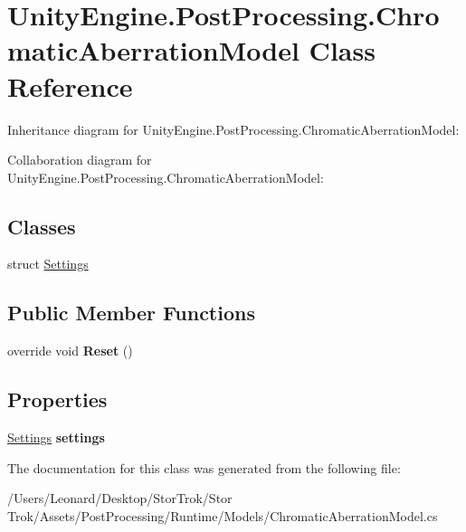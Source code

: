 \hypertarget{class_unity_engine_1_1_post_processing_1_1_chromatic_aberration_model}{}\section{Unity\+Engine.\+Post\+Processing.\+Chromatic\+Aberration\+Model Class Reference}
\label{class_unity_engine_1_1_post_processing_1_1_chromatic_aberration_model}


Inheritance diagram for Unity\+Engine.\+Post\+Processing.\+Chromatic\+Aberration\+Model\+:


Collaboration diagram for Unity\+Engine.\+Post\+Processing.\+Chromatic\+Aberration\+Model\+:
\subsection*{Classes}
\begin{DoxyCompactItemize}
\item 
struct \hyperlink{struct_unity_engine_1_1_post_processing_1_1_chromatic_aberration_model_1_1_settings}{Settings}
\end{DoxyCompactItemize}
\subsection*{Public Member Functions}
\begin{DoxyCompactItemize}
\item 
\mbox{\label{class_unity_engine_1_1_post_processing_1_1_chromatic_aberration_model_a10912d80b3a86b38f88a0bfee52ff948}} 
override void {\bfseries Reset} ()
\end{DoxyCompactItemize}
\subsection*{Properties}
\begin{DoxyCompactItemize}
\item 
\mbox{\label{class_unity_engine_1_1_post_processing_1_1_chromatic_aberration_model_ae3d8ac283bcf4f8c8d115b0f026d0da2}} 
\hyperlink{struct_unity_engine_1_1_post_processing_1_1_chromatic_aberration_model_1_1_settings}{Settings} {\bfseries settings}
\end{DoxyCompactItemize}


The documentation for this class was generated from the following file\+:\begin{DoxyCompactItemize}
\item 
/\+Users/\+Leonard/\+Desktop/\+Stor\+Trok/\+Stor Trok/\+Assets/\+Post\+Processing/\+Runtime/\+Models/Chromatic\+Aberration\+Model.\+cs\end{DoxyCompactItemize}
